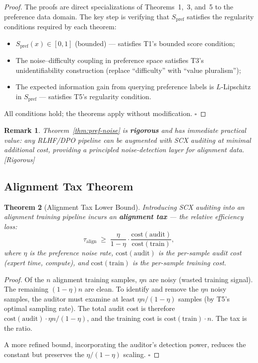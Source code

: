 \documentclass[12pt,a4paper]{article}
\newtheorem{theorem}{Theorem}[section]
\newtheorem{remark}[theorem]{Remark}
\newcommand{\rigorous}{\textcolor{green!50!black}{\small\textsf{[Rigorous]}}}
\begin{document}
\begin{proof}
The proofs are direct specializations of Theorems~1,~3, and~5 to the preference
data domain.  The key step is verifying that $S_{\mathrm{pref}}$ satisfies the
regularity conditions required by each theorem:
\begin{itemize}
    \item $S_{\mathrm{pref}}(x)\in[0,1]$ (bounded) — satisfies T1's bounded
          score condition;
    \item The noise--difficulty coupling in preference space satisfies T3's
          unidentifiability construction (replace ``difficulty'' with ``value
          pluralism'');
    \item The expected information gain from querying preference labels is
          $L$-Lipschitz in $S_{\mathrm{pref}}$ — satisfies T5's regularity
          condition.
\end{itemize}
All conditions hold; the theorems apply without modification. $\square$
\end{proof}

\begin{remark}
Theorem~\ref{thm:pref-noise} is \textbf{rigorous} and has immediate practical
value: any RLHF/DPO pipeline can be augmented with SCX auditing at minimal
additional cost, providing a principled noise-detection layer for alignment
data.  \rigorous
\end{remark}

\subsection{Alignment Tax Theorem}

\begin{theorem}[Alignment Tax Lower Bound]
\label{thm:align-tax}
Introducing SCX auditing into an alignment training pipeline incurs an
\textbf{alignment tax} — the relative efficiency loss:
\begin{equation}\label{eq:tau-align}
    \tau_{\mathrm{align}} \;\geq\;
    \frac{\eta}{1-\eta}\cdot
    \frac{\mathrm{cost}(\mathrm{audit})}{\mathrm{cost}(\mathrm{train})},
\end{equation}
where $\eta$ is the preference noise rate,
$\mathrm{cost}(\mathrm{audit})$ is the per-sample audit cost (expert time,
compute), and $\mathrm{cost}(\mathrm{train})$ is the per-sample training cost.
\end{theorem}

\begin{proof}
Of the $n$ alignment training samples, $\eta n$ are noisy (wasted training
signal).  The remaining $(1-\eta)n$ are clean.  To identify and remove the
$\eta n$ noisy samples, the auditor must examine at least $\eta n/(1-\eta)$
samples (by T5's optimal sampling rate).  The total audit cost is therefore
$\mathrm{cost}(\mathrm{audit})\cdot\eta n/(1-\eta)$, and the training cost is
$\mathrm{cost}(\mathrm{train})\cdot n$.  The tax is the ratio.

A more refined bound, incorporating the auditor's detection power, reduces the
constant but preserves the $\eta/(1-\eta)$ scaling. $\square$
\end{proof}
\end{document}
